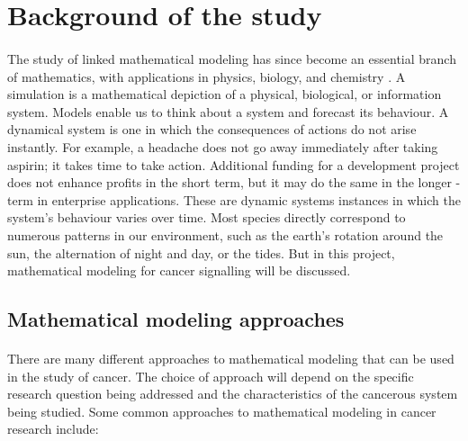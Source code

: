 \section{Background of the study}
\label{sec:1.1}

\paragraph{}

The study of linked mathematical modeling has since become an essential branch of mathematics, with applications in physics, biology, and chemistry \cite{fowler1997mathematical}. A simulation is a mathematical depiction of a physical, biological, or information system.  Models enable us to think about a system and forecast its behaviour. A dynamical system is one in which the consequences of actions do not arise instantly.  For example, a headache does not go away immediately after taking aspirin; it takes time to take action. Additional funding for a development project does not enhance profits in the  short term, but it may do the same in the longer - term in enterprise applications. These are dynamic systems instances in which the system's behaviour varies over time. Most species directly correspond to numerous patterns in our environment, such as the earth's rotation around the sun, the alternation of night and day, or the tides. But in this project, mathematical modeling for cancer signalling will be discussed. 


\subsection{Mathematical modeling approaches}
\paragraph{}

There are many different approaches to mathematical modeling that can be used in the study of cancer. The choice of approach will depend on the specific research question being addressed and the characteristics of the cancerous system being studied. Some common approaches to mathematical modeling in cancer research include:

